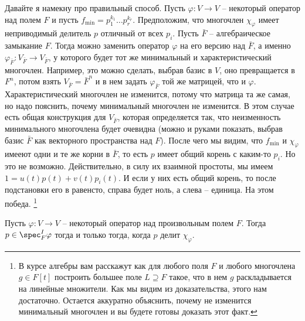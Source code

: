 \begin{itemize}
Давайте я намекну про правильный способ.
Пусть $\varphi\colon V\to V$ -- некоторый оператор над полем $F$ и пусть $f_\text{min} = p_1^{k_1}\ldots p_r^{k_r}$.
Предположим, что многочлен $\chi_\varphi$ имеет неприводимый делитель $p$ отличный от всех $p_i$.
Пусть $\bar F$ -- алгебраическое замыкание $F$.
Тогда можно заменить оператор $\varphi$ на его версию над $\bar F$, а именно $\varphi_{\bar F}\colon V_{\bar F}\to V_{\bar F}$, у которого будет тот же минимальный и характеристический многочлен.
Например, это можно сделать, выбрав базис в $V$, оно превращается в $F^n$, потом взять $V_{\bar F} = \bar F^n$ и в нем задать $\varphi_{\bar F}$ той же матрицей, что и $\varphi$.
Характеристический многочлен не изменится, потому что матрица та же самая, но надо пояснить, почему минимальный многочлен не изменится.
В этом случае есть общая конструкция для $V_{\bar F}$, которая определяется так, что неизменность минимального многочлена будет очевидна (можно и руками показать, выбрав базис $\bar F$ как векторного пространства над $F$).
После чего мы видим, что $f_\text{min}$ и $\chi_\varphi$ имееют одни и те же корни в $\bar F$, то есть $p$ имеет общий корень с каким-то $p_i$.
Но это не возможно.
Действительно, в силу их взаимной простоты, мы имеем $1 = u(t) p(t) + v(t) p_i(t)$.
И если у них есть общий корень, то после подстановки его в равенсто, справа будет ноль, а слева -- единица.
На этом победа.%
\footnote{В курсе алгебры вам расскажут как для любого поля $F$ и любого многочлена $g\in F[t]$ построить большее поле $L\supseteq F$ такое, что в нем $g$ раскладывается на линейные множители.
Как мы видим из доказательства, этого нам достаточно.
Остается аккуратно объяснить, почему не изменится минимальный многочлен и вы будете готовы доказать этот факт.}
\end{itemize}

\begin{claim}[БД]
Пусть $\varphi\colon V\to V$ -- некоторый оператор над произвольным полем $F$.
Тогда $p\in \spec_F^I \varphi$ тогда и только тогда, когда $p$ делит $\chi_\varphi$.
\end{claim}
